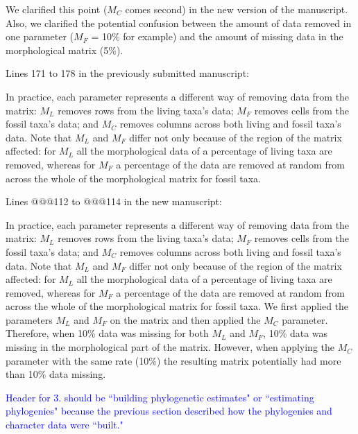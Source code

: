 \documentclass[11pt]{letter}
\begin{document}
\begin{letter}{}
We clarified this point ($M_C$ comes second) in the new version of the manuscript. Also, we clarified the potential confusion between the amount of data removed in one parameter ($M_F$ = 10\% for example) and the amount of missing data in the morphological matrix (5\%).

Lines 171 to 178 in the previously submitted manuscript:

\hfill\begin{minipage}{\dimexpr\textwidth-1cm}
In practice, each parameter represents a different way of removing data from the matrix: $M_L$ removes rows from the living taxa's data; $M_F$ removes cells from the fossil taxa's data; and $M_C$ removes columns across both living and fossil taxa's data. Note that $M_L$ and $M_F$ differ not only because of the region of the matrix affected: for $M_L$ all the morphological data of a percentage of living taxa are removed, whereas for $M_F$ a percentage of the data are removed at random from across the whole of the morphological matrix for fossil taxa.
\end{minipage}

Lines @@@112 to @@@114 in the new manuscript:

\hfill\begin{minipage}{\dimexpr\textwidth-1cm}
In practice, each parameter represents a different way of removing data from the matrix: $M_L$ removes rows from the living taxa's data; $M_F$ removes cells from the fossil taxa's data; and $M_C$ removes columns across both living and fossil taxa's data. Note that $M_L$ and $M_F$ differ not only because of the region of the matrix affected: for $M_L$ all the morphological data of a percentage of living taxa are removed, whereas for $M_F$ a percentage of the data are removed at random from across the whole of the morphological matrix for fossil taxa. We first applied the parameters $M_L$ and $M_F$ on the matrix and then applied the $M_C$ parameter. Therefore, when 10\% data was missing for both $M_L$ and $M_F$, 10\% data was missing in the morphological part of the matrix. However, when applying the $M_C$ parameter with the same rate (10\%) the resulting matrix potentially had more than 10\% data missing.
\end{minipage}


\textcolor{blue}{Header for 3. should be ``building phylogenetic estimates" or ``estimating phylogenies" because the previous section described how the phylogenies and character data were ``built."}


\end{letter}
\end{document}
